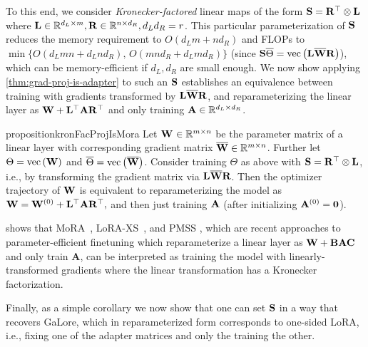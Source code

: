 To this end, we consider \emph{Kronecker-factored} linear maps of the form ${\mathbf{S}} = {\mathbf{R}}^\top \otimes {\mathbf{L}}$ where ${\mathbf{L}} \in \mathbb{R}^{d_L \times m}, {\mathbf{R}} \in \mathbb{R}^{n \times d_R}, d_L d_R = r$. This particular parameterization of ${\mathbf{S}}$ reduces the memory requirement to $O(d_Lm + nd_R)$ and FLOPs to $\min\{O(d_L m n + d_L n d_R), \, O(m n d_R + d_L m d_R)\}$ (since ${\mathbf{S}}\overline{\Theta} = \operatorname{vec}\left({\mathbf{L}} \overline{{\mathbf{W}}} {\mathbf{R}}\right)$), which can be memory-efficient if $d_L, d_R$ are small enough. 
We now show applying \cref{thm:grad-proj-is-adapter} to such an ${\mathbf{S}}$ establishes an equivalence between training with gradients transformed by ${{\mathbf{L}} \overline{{\mathbf{W}}} {\mathbf{R}}}$, and  reparameterizing the linear layer as ${\mathbf{W}} + {\mathbf{L}}^\top {\mathbf{A}} {\mathbf{R}}^\top$ and only training ${\mathbf{A}} \in \mathbb{R}^{d_L \times d_R}$.


\begin{restatable}{proposition}{kronFacProjIsMora}
     Let ${\mathbf{W}}^{} \in \mathbb{R}^{m \times n}$ be the parameter matrix of a linear layer with corresponding gradient matrix $\overline{{\mathbf{W}}} \in \mathbb{R}^{m \times n}$. Further let $\Theta = \operatorname{vec}\left({\mathbf{W}}\right)$ and $\overline{\Theta} = \operatorname{vec}\left(\overline{{\mathbf{W}}}\right)$. Consider training $\Theta$ as above with ${\mathbf{S}} = {\mathbf{R}}^\top \otimes {\mathbf{L}}$, i.e., by transforming the gradient matrix via ${\mathbf{L}} \overline{{\mathbf{W}}}{\mathbf{R}}$.
Then the optimizer trajectory of ${\mathbf{W}}$ is equivalent to reparameterizing the model as
$
{\mathbf{W}} = {\mathbf{W}}^{(0)} + {\mathbf{L}}^\top {\mathbf{A}} {\mathbf{R}}^\top,
$
and then just training ${\mathbf{A}}$ (after initializing ${\mathbf{A}}^{(0)} = {\mathbf{0}}$).
\label{thm:kron-factored-proj-is-mora}
\end{restatable}
\begin{remark}
 shows that MoRA~\citep{mora}, LoRA-XS~\citep{balazy2024lora}, and PMSS \cite{wang2024pmss}, which are recent approaches to parameter-efficient finetuning which reparameterize a linear layer as ${\mathbf{W}} + {\mathbf{B}} {\mathbf{A}} {\mathbf{C}}$ and only train $\mathbf{A}$, can  be interpreted as training the model with linearly-transformed gradients where the linear transformation has a Kronecker factorization.
\end{remark}

Finally, as a simple corollary we now show that one can set ${\mathbf{S}}$ in a way that recovers GaLore, which in reparameterized form corresponds to one-sided LoRA, i.e., fixing one of the adapter matrices and only the training the other.





